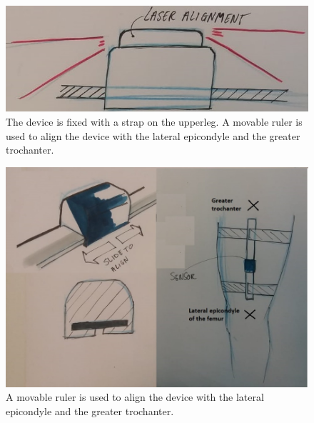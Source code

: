 \documentclass[whitelogo]{tudelft-report}
\begin{document}
{{{\begin{figure}[!htb]
	\includegraphics[width=0.5\linewidth]{laser_alignment.jpg}
	\caption{The device is fixed with a strap on the upperleg. A movable ruler is used to align the device with the lateral epicondyle and the greater trochanter.}
	\label{fig:my_label}
\end{figure}
\begin{figure}[!htb]
	\includegraphics[width=1\linewidth]{ruler_alignment2.jpg}
	\caption{A movable ruler is used to align the device with the lateral epicondyle and the greater trochanter.}
	\label{fig:my_label}
\end{figure}

}}}
\end{document}
